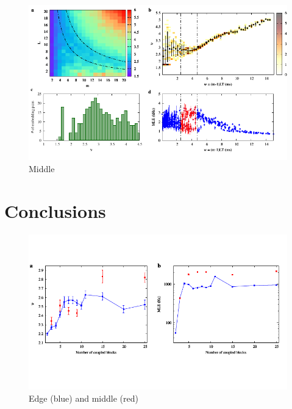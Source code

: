 \begin{figure}[H]
    \centering
    \includegraphics[width=\linewidth]{../25_blocks/middle/2e5_points/plots/chaos_low.pdf}
    \caption{Middle}
    \label{fig:25 blocks chaos middle}
\end{figure}


\section{Conclusions}

\begin{figure}[H]
    \centering
    \includegraphics[width=\linewidth,trim={0 1.5cm 0 1.3cm},clip]
    {../data/nu_mle_blocks.pdf}
    \caption{Edge (blue) and middle (red)}
    \label{fig:nu mle blocks}
\end{figure}
